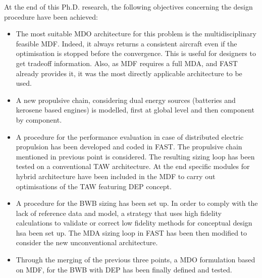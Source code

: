 At the end of this Ph.D. research, the following objectives concerning the design procedure have been achieved: 
\begin{itemize}
	\item The most suitable MDO architecture for this problem is the multidisciplinary feasible MDF. 
	Indeed, it always returns a consistent aircraft even if the optimisation is stopped before the convergence.
	This is useful for designers to get tradeoff information. 
	Also, as MDF requires a full MDA, and FAST already provides it, it was the most directly applicable architecture to be used. 
	
	\item A new propulsive chain, considering dual energy sources (batteries and kerosene based engines) is modelled, first at global level and then component by component. 
	
	\item A procedure for the performance evaluation in case of distributed electric propulsion has been developed and coded in FAST.
	The propulsive chain mentioned in previous point is considered.  
	The resulting sizing loop has been tested on a conventional TAW architecture.
	At the end specific modules for hybrid architecture have been included in the MDF to carry out optimisations of the TAW featuring DEP concept. 
	
	\item A procedure for the BWB sizing has been set up. 
	In order to comply with the lack of reference data and model, a strategy that uses high fidelity calculations to validate or correct low fidelity methods for conceptual design hsa been set up. 
	The MDA sizing loop in FAST has been then modified to consider the new unconventional architecture. 
	
	\item Through the merging of the previous three points, a MDO formulation based on MDF, for the BWB with DEP has been finally defined and tested. 
\end{itemize}

